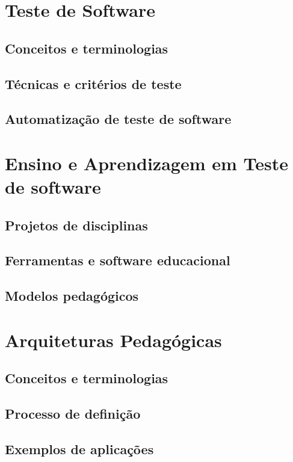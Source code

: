 
\section{Teste de Software}

\subsection{Conceitos e terminologias}
\subsection{Técnicas e critérios de teste}
\subsection{Automatização de teste de software}

\section{Ensino e Aprendizagem em Teste de software}
\subsection{Projetos de disciplinas}
\subsection{Ferramentas e software educacional}
\subsection{Modelos pedagógicos}

\section{Arquiteturas Pedagógicas}
\subsection{Conceitos e terminologias}
\subsection{Processo de definição}
\subsection{Exemplos de aplicações}